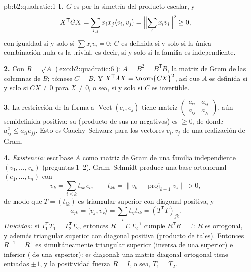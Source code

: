 \begin{solution}{pb:b2:quadratic:1}
\textbf{1.} $G$ es  por la simetría del producto escalar, y
\[
X^{\mathsf T}GX = \sum_{i,j}x_ix_j\langle v_i, v_j\rangle
= \Bigl\|\sum_i x_iv_i\Bigr\|^2 \geq 0 ,
\]
con igualdad si y solo si $\sum x_iv_i = 0$: $G$ es definida si y solo
si la única combinación nula es la trivial, es decir, si y solo si la
familia es independiente.

\textbf{2.} Con $B = \sqrt A$ (\cref{exo:b2:quadratic:6}): $A = B^2 =
B^{\mathsf T}B$, la matriz de Gram de las columnas de $B$; tómese $C =
B$. Y $X^{\mathsf T}AX = \norm{CX}^2$, así que $A$ es definida si y
solo si $CX \neq 0$ para $X \neq 0$, o sea, si y solo si $C$ es
invertible.

\textbf{3.} La restricción de la forma a $\operatorname{Vect}(e_i,
e_j)$ tiene matriz $\begin{pmatrix} a_{ii} & a_{ij}\\ a_{ij} & a_{jj}
\end{pmatrix}$, aún semidefinida positiva: su  (producto de
sus  no negativos) es $\geq 0$, de donde $a_{ij}^2 \leq
a_{ii}a_{jj}$. Esto es Cauchy--Schwarz para los vectores $v_i, v_j$ de
una realización de Gram.

\textbf{4.} \emph{Existencia:} escríbase $A$ como matriz de Gram de una
familia independiente $(v_1, \dots, v_n)$ (preguntas 1--2).
Gram--Schmidt produce una base ortonormal $(e_1, \dots, e_n)$ con
\[
v_k = \sum_{i \leq k} t_{ik}\,e_i,
\qquad t_{kk} = \bigl\| v_k - \operatorname{proj}_{k-1}v_k
\bigr\| > 0 ,
\]
de modo que $T = (t_{ik})$ es triangular superior con diagonal
positiva, y
\[
a_{jk} = \langle v_j, v_k\rangle
= \sum_i t_{ij}t_{ik} = (T^{\mathsf T}T)_{jk} .
\]
\emph{Unicidad:} si $T_1^{\mathsf T}T_1 = T_2^{\mathsf T}T_2$, entonces
$R = T_1T_2^{-1}$ cumple $R^{\mathsf T}R = I$: $R$ es ortogonal, y
además triangular superior con diagonal positiva (producto de tales).
Entonces $R^{-1} = R^{\mathsf T}$ es simultáneamente triangular
superior (inversa de una superior) e inferior ( de una
superior): es diagonal; una matriz diagonal ortogonal tiene entradas
$\pm1$, y la positividad fuerza $R = I$, o sea, $T_1 = T_2$.


\end{solution}
